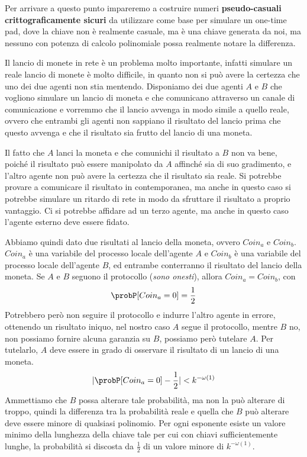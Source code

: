 Per arrivare a questo punto impareremo a costruire numeri \textbf{pseudo-casuali
crittograficamente sicuri} da utilizzare come base per simulare un one-time pad, 
dove la chiave non è realmente casuale, ma è una chiave generata da noi, 
ma nessuno con potenza di calcolo polinomiale possa realmente notare la 
differenza.

Il lancio di monete in rete è un problema molto importante, infatti simulare 
un reale lancio di monete è molto difficile, in quanto non si può avere
la certezza che uno dei due agenti non stia mentendo.
Disponiamo dei due agenti $A$ e $B$ che vogliono simulare un
lancio di moneta e che comunicano attraverso un canale di comunicazione
e vorremmo che il lancio avvenga in modo simile a quello reale, ovvero
che entrambi gli agenti non sappiano il risultato del lancio prima che
questo avvenga e che il risultato sia frutto del lancio di una moneta.

Il fatto che $A$ lanci la moneta e che comunichi il risultato a $B$ non
va bene, poiché il risultato può essere manipolato da $A$ affinché sia 
di suo gradimento, e l'altro agente non può avere la certezza che il
risultato sia reale.
Si potrebbe provare a comunicare il risultato in contemporanea, ma anche
in questo caso si potrebbe simulare un ritardo di rete in modo da 
sfruttare il risultato a proprio vantaggio.
Ci si potrebbe affidare ad un terzo agente, ma anche in questo caso
l'agente esterno deve essere fidato.

Abbiamo quindi dato due risultati al lancio della moneta, ovvero
$Coin_a$ e $Coin_b$. $Coin_a$ è una variabile del processo locale dell'agente
$A$ e $Coin_b$ è una variabile del processo locale dell'agente $B$, ed entrambe
conterranno il risultato del lancio della moneta. Se $A$ e $B$ seguono 
il protocollo (\textit{sono onesti}), allora $Coin_a = Coin_b$, con 
\[
  \probP[Coin_a = 0] = \frac{1}{2}
\]
Potrebbero però non seguire il protocollo e indurre l'altro agente in errore, ottenendo 
un risultato iniquo, nel nostro caso $A$ segue il protocollo, mentre $B$ no, non possiamo 
fornire alcuna garanzia su $B$, possiamo però tutelare $A$. Per tutelarlo, 
$A$ deve essere in grado di osservare il risultato di un lancio di una 
moneta.
\[
  | \probP[Coin_a = 0] - \frac{1}{2} | < k^{-\omega(1)}
\]
Ammettiamo che $B$ possa alterare tale probabilità, ma non la può alterare di troppo,
quindi la differenza tra la probabilità reale e quella che $B$ può alterare deve essere
minore di qualsiasi polinomio. Per ogni esponente esiste un valore minimo della 
lunghezza della chiave tale per cui con chiavi sufficientemente lunghe, 
la probabilità si discosta da $\frac{1}{2}$ di un valore minore di $k^{-\omega(1)}$.
